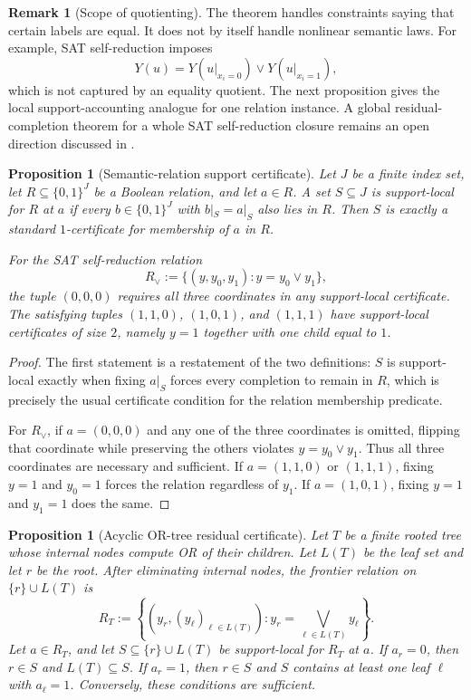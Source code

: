 \documentclass[11pt]{article}
\newtheorem{proposition}[theorem]{Proposition}
\theoremstyle{definition}
\newtheorem{remark}[theorem]{Remark}
\newcommand{\bits}{\{0,1\}}
\begin{document}
\begin{remark}[Scope of quotienting]\label{rem:quotient-scope}
The theorem handles constraints saying that certain labels are equal.  It does not by itself handle nonlinear semantic laws.  For example, SAT self-reduction imposes
\[
  Y(u)=Y(u|_{x_i=0})\vee Y(u|_{x_i=1}),
\]
which is not captured by an equality quotient.  The next proposition gives the local support-accounting analogue for one relation instance.  A global residual-completion theorem for a whole SAT self-reduction closure remains an open direction discussed in .
\end{remark}

\begin{proposition}[Semantic-relation support certificate]\label{prop:semantic-relation-support}
Let \(J\) be a finite index set, let \(R\subseteq\bits^J\) be a Boolean relation, and let \(a\in R\).  A set \(S\subseteq J\) is support-local for \(R\) at \(a\) if every \(b\in\bits^J\) with \(b|_S=a|_S\) also lies in \(R\).  Then \(S\) is exactly a standard \(1\)-certificate for membership of \(a\) in \(R\).

For the SAT self-reduction relation
\[
  R_{\vee}:=\{(y,y_0,y_1): y=y_0\vee y_1\},
\]
the tuple \((0,0,0)\) requires all three coordinates in any support-local certificate.  The satisfying tuples \((1,1,0)\), \((1,0,1)\), and \((1,1,1)\) have support-local certificates of size \(2\), namely \(y=1\) together with one child equal to \(1\).
\end{proposition}

\begin{proof}
The first statement is a restatement of the two definitions: \(S\) is support-local exactly when fixing \(a|_S\) forces every completion to remain in \(R\), which is precisely the usual certificate condition for the relation membership predicate.

For \(R_{\vee}\), if \(a=(0,0,0)\) and any one of the three coordinates is omitted, flipping that coordinate while preserving the others violates \(y=y_0\vee y_1\).  Thus all three coordinates are necessary and sufficient.  If \(a=(1,1,0)\) or \((1,1,1)\), fixing \(y=1\) and \(y_0=1\) forces the relation regardless of \(y_1\).  If \(a=(1,0,1)\), fixing \(y=1\) and \(y_1=1\) does the same.
\end{proof}

\begin{proposition}[Acyclic OR-tree residual certificate]\label{prop:acyclic-or-tree-residual}
Let \(T\) be a finite rooted tree whose internal nodes compute OR of their children.  Let \(L(T)\) be the leaf set and let \(r\) be the root.  After eliminating internal nodes, the frontier relation on \(\{r\}\cup L(T)\) is
\[
  R_T
  :=\left\{(y_r,(y_\ell)_{\ell\in L(T)}):
      y_r=\bigvee_{\ell\in L(T)}y_\ell\right\}.
\]
Let \(a\in R_T\), and let \(S\subseteq\{r\}\cup L(T)\) be support-local for \(R_T\) at \(a\).  If \(a_r=0\), then \(r\in S\) and \(L(T)\subseteq S\).  If \(a_r=1\), then \(r\in S\) and \(S\) contains at least one leaf \(\ell\) with \(a_\ell=1\).  Conversely, these conditions are sufficient.
\end{proposition}
\end{document}
